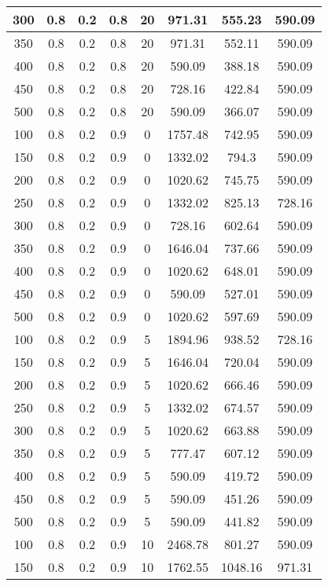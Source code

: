 \documentclass[a4paper, 12pt]{extreport}
\begin{document}
\begin{itemize}
\begin{longtable}{|c|c|c|c|c|c|c|c|}
			300 & 0.8 & 0.2 & 0.8 & 20 & 971.31 & 555.23 & 590.09 \\\hline
			350 & 0.8 & 0.2 & 0.8 & 20 & 971.31 & 552.11 & 590.09 \\\hline
			400 & 0.8 & 0.2 & 0.8 & 20 & 590.09 & 388.18 & 590.09 \\\hline
			450 & 0.8 & 0.2 & 0.8 & 20 & 728.16 & 422.84 & 590.09 \\\hline
			500 & 0.8 & 0.2 & 0.8 & 20 & 590.09 & 366.07 & 590.09 \\\hline
			100 & 0.8 & 0.2 & 0.9 & 0 & 1757.48 & 742.95 & 590.09 \\\hline
			150 & 0.8 & 0.2 & 0.9 & 0 & 1332.02 & 794.3 & 590.09 \\\hline
			200 & 0.8 & 0.2 & 0.9 & 0 & 1020.62 & 745.75 & 590.09 \\\hline
			250 & 0.8 & 0.2 & 0.9 & 0 & 1332.02 & 825.13 & 728.16 \\\hline
			300 & 0.8 & 0.2 & 0.9 & 0 & 728.16 & 602.64 & 590.09 \\\hline
			350 & 0.8 & 0.2 & 0.9 & 0 & 1646.04 & 737.66 & 590.09 \\\hline
			400 & 0.8 & 0.2 & 0.9 & 0 & 1020.62 & 648.01 & 590.09 \\\hline
			450 & 0.8 & 0.2 & 0.9 & 0 & 590.09 & 527.01 & 590.09 \\\hline
			500 & 0.8 & 0.2 & 0.9 & 0 & 1020.62 & 597.69 & 590.09 \\\hline
			100 & 0.8 & 0.2 & 0.9 & 5 & 1894.96 & 938.52 & 728.16 \\\hline
			150 & 0.8 & 0.2 & 0.9 & 5 & 1646.04 & 720.04 & 590.09 \\\hline
			200 & 0.8 & 0.2 & 0.9 & 5 & 1020.62 & 666.46 & 590.09 \\\hline
			250 & 0.8 & 0.2 & 0.9 & 5 & 1332.02 & 674.57 & 590.09 \\\hline
			300 & 0.8 & 0.2 & 0.9 & 5 & 1020.62 & 663.88 & 590.09 \\\hline
			350 & 0.8 & 0.2 & 0.9 & 5 & 777.47 & 607.12 & 590.09 \\\hline
			400 & 0.8 & 0.2 & 0.9 & 5 & 590.09 & 419.72 & 590.09 \\\hline
			450 & 0.8 & 0.2 & 0.9 & 5 & 590.09 & 451.26 & 590.09 \\\hline
			500 & 0.8 & 0.2 & 0.9 & 5 & 590.09 & 441.82 & 590.09 \\\hline
			100 & 0.8 & 0.2 & 0.9 & 10 & 2468.78 & 801.27 & 590.09 \\\hline
			150 & 0.8 & 0.2 & 0.9 & 10 & 1762.55 & 1048.16 & 971.31 \\\hline

\end{longtable}
\end{itemize}
\end{document}
